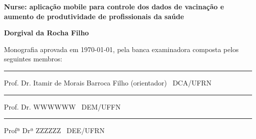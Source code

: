 %
%

\begin{titlepage}

\begin{center}

\LARGE

\textbf{Nurse: aplicação mobile para controle dos dados de vacinação e aumento de produtividade de profissionais da saúde}

\vfill

\Large

\textbf{Dorgival da Rocha Filho}

\end{center}

\vfill

\noindent
Monografia aprovada em \today, pela banca examinadora composta
pelos seguintes membros:


\begin{center}

\vspace{1.5cm}\rule{0.95\linewidth}{1pt}
\parbox{0.9\linewidth}{%
Prof. Dr. Itamir de Morais Barroca Filho (orientador) \dotfill\ DCA/UFRN}


\vspace{1.5cm}\rule{0.95\linewidth}{1pt}
\parbox{0.9\linewidth}{%
Prof. Dr. WWWWWW \dotfill\ DEM/UFFN}

\vspace{1.5cm}\rule{0.95\linewidth}{1pt}
\parbox{0.9\linewidth}{%
Profª Drª ZZZZZZ \dotfill\ DEE/UFRN}

\end{center}

\end{titlepage}

%
%


